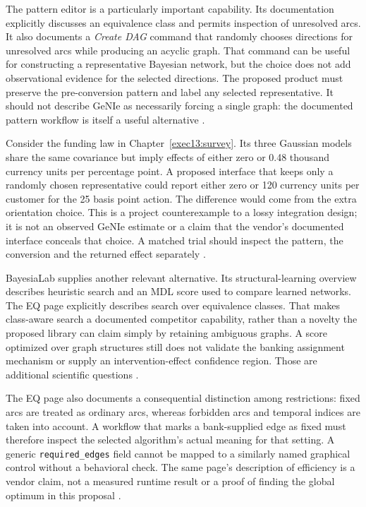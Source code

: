 The pattern editor is a particularly important capability. Its documentation
explicitly discusses an equivalence class and permits inspection of unresolved
arcs. It also documents a \emph{Create DAG} command that randomly chooses
directions for unresolved arcs while producing an acyclic graph. That command
can be useful for constructing a representative Bayesian network, but the
choice does not add observational evidence for the selected directions.
The proposed product must preserve the pre-conversion pattern and label any
selected representative. It should not describe GeNIe as necessarily forcing
a single graph: the documented pattern workflow is itself a useful alternative
\citep{exec13_genie_pattern}.

Consider the funding law in Chapter~\ref{exec13:survey}. Its three Gaussian
models share the same covariance but imply effects of either zero or 0.48
thousand currency units per percentage point. A proposed interface that keeps
only a randomly chosen representative could report either zero or 120 currency
units per customer for the 25 basis point action. The difference would come
from the extra orientation choice. This is a project counterexample to a
lossy integration design; it is not an observed GeNIe estimate or a claim
that the vendor's documented interface conceals that choice. A matched trial
should inspect the pattern, the conversion and the returned effect separately
\citep{exec13_examples}.

BayesiaLab supplies another relevant alternative. Its structural-learning
overview describes heuristic search and an MDL score used to compare learned
networks. The EQ page explicitly describes search over equivalence classes.
That makes class-aware search a documented competitor capability, rather
than a novelty the proposed library can claim simply by retaining ambiguous
graphs. A score optimized over graph structures still does not validate
the banking assignment mechanism or supply an intervention-effect confidence
region. Those are additional scientific questions
\citep{exec13_bayesia_structure,exec13_bayesia_eq}.

The EQ page also documents a consequential distinction among restrictions:
fixed arcs are treated as ordinary arcs, whereas forbidden arcs and temporal
indices are taken into account. A workflow that marks a bank-supplied edge
as fixed must therefore inspect the selected algorithm's actual meaning for
that setting. A generic \texttt{required\_edges} field cannot be mapped to a
similarly named graphical control without a behavioral check. The same page's
description of efficiency is a vendor claim, not a measured runtime result
or a proof of finding the global optimum in this proposal
\citep{exec13_bayesia_eq}.

